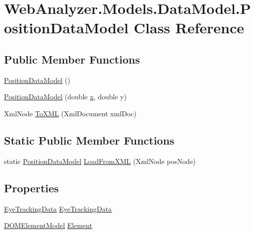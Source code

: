 \hypertarget{class_web_analyzer_1_1_models_1_1_data_model_1_1_position_data_model}{}\section{Web\+Analyzer.\+Models.\+Data\+Model.\+Position\+Data\+Model Class Reference}
\label{class_web_analyzer_1_1_models_1_1_data_model_1_1_position_data_model}
\subsection*{Public Member Functions}
\begin{DoxyCompactItemize}
\item 
\hyperlink{class_web_analyzer_1_1_models_1_1_data_model_1_1_position_data_model_ad8fdd7054415f4211babc9a8b838ed22}{Position\+Data\+Model} ()
\item 
\hyperlink{class_web_analyzer_1_1_models_1_1_data_model_1_1_position_data_model_a6437d1861b580734e69e1eb6c1f90a1f}{Position\+Data\+Model} (double \hyperlink{_u_i_2_h_t_m_l_resources_2js_2lib_2underscore_8min_8js_a81e910173af87b1161e719a504d52407}{x}, double y)
\item 
Xml\+Node \hyperlink{class_web_analyzer_1_1_models_1_1_data_model_1_1_position_data_model_a371659171eacec3ce6a1f641a11df165}{To\+X\+M\+L} (Xml\+Document xml\+Doc)
\end{DoxyCompactItemize}
\subsection*{Static Public Member Functions}
\begin{DoxyCompactItemize}
\item 
static \hyperlink{class_web_analyzer_1_1_models_1_1_data_model_1_1_position_data_model}{Position\+Data\+Model} \hyperlink{class_web_analyzer_1_1_models_1_1_data_model_1_1_position_data_model_a685b721ae7f666981d7da3e599641cb0}{Load\+From\+X\+M\+L} (Xml\+Node pos\+Node)
\end{DoxyCompactItemize}
\subsection*{Properties}
\begin{DoxyCompactItemize}
\item 
\hyperlink{class_web_analyzer_1_1_models_1_1_data_model_1_1_eye_tracking_data}{Eye\+Tracking\+Data} \hyperlink{class_web_analyzer_1_1_models_1_1_data_model_1_1_position_data_model_a06815dcd63aca4dcd91f2d5346f03afd}{Eye\+Tracking\+Data}
\item 
\hyperlink{class_web_analyzer_1_1_models_1_1_data_model_1_1_d_o_m_element_model}{D\+O\+M\+Element\+Model} \hyperlink{class_web_analyzer_1_1_models_1_1_data_model_1_1_position_data_model_a4825afc0a1ecf3eeb0876be8611111ba}{Element}
\end{DoxyCompactItemize}
